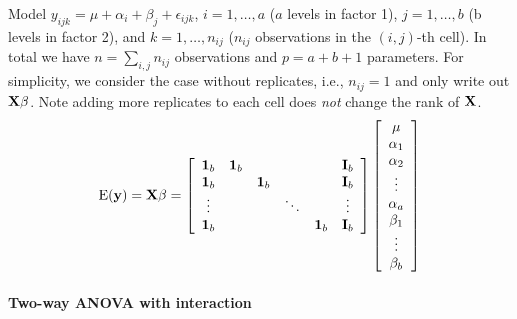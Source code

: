 Model $y_{ijk} = \mu + \alpha_i + \beta_j + \epsilon_{ijk}$, $i = 1, \dots, a$ ($a$ levels in factor 1), $j = 1, \dots, b$ (b levels in factor 2), and $k = 1, \dots, n_{ij}$ ($n_{ij}$ observations in the $(i,j)$-th cell).
In total we have $n = \sum_{i,j} n_{ij}$ observations and $p = a + b+ 1$ parameters.
For simplicity, we consider the case without replicates, i.e., $n_{ij}= 1$ and only write out $\mathbf{X\beta}$.
Note adding more replicates to each cell does {\it not} change the rank of $\mathbf{X}$.
$$
\mbox{E}(\mathbf{y}) = \mathbf{X\beta} = \left[ \begin{array}{cccccc} \mathbf{1}_b   & \mathbf{1}_b &  & & & \mathbf{I}_b \\ \mathbf{1}_b &  & \mathbf{1}_b & & & \mathbf{I}_b \\ \vdots &  & & \ddots & & \vdots \\ \mathbf{1}_b & &  &  & \mathbf{1}_b & \mathbf{I}_b\\ \end{array} \right] \left[ \begin{array}{c} \mu\\ \alpha_1 \\ \alpha_2\\ \vdots \\ \alpha_a \\ \beta_1 \\ \vdots\\ \beta_b \end{array} \right] 
$$

\paragraph{Two-way ANOVA with interaction}

